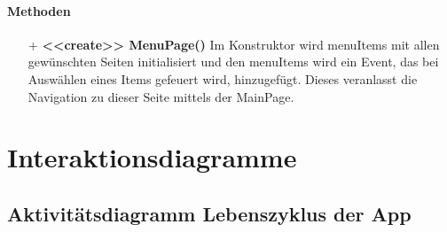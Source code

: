 \documentclass[a4paper,12pt]{article}
\begin{document}
		\paragraph{Methoden}
		\begin{itemize}
			\item [+] \textbf{<<create>> MenuPage()} Im Konstruktor wird menuItems mit allen gewünschten Seiten initialisiert und den menuItems wird ein Event, das bei Auswählen eines Items gefeuert wird, hinzugefügt. Dieses veranlasst die Navigation zu dieser Seite mittels der MainPage.
		\end{itemize}
	
\newpage
\section{Interaktionsdiagramme}
\subsection{Aktivitätsdiagramm Lebenszyklus der App}
\end{document}
